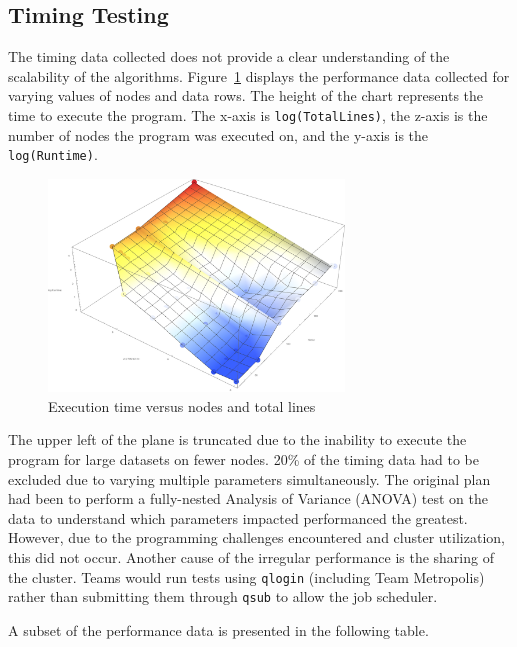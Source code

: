 

%
%

\subsection{Timing Testing}

The timing data collected does not provide a clear understanding of the scalability of the algorithms. Figure~\ref{fig:plane} displays the performance data collected for varying values of nodes and data rows. The height of the chart represents the time to execute the program. The x-axis is \texttt{log(TotalLines)}, the z-axis is the number of nodes the program was executed on, and the y-axis is the \texttt{log(Runtime)}.


\begin{figure}
\centering
\includegraphics[width=0.7\textwidth]{./images/runtimes.png}
\caption{Execution time versus nodes and total lines}
\label{fig:plane}
\end{figure}


The upper left of the plane is truncated due to the inability to execute the program for large datasets on fewer nodes. 20\% of the timing data had to be excluded due to varying multiple parameters simultaneously. The original plan had been to perform a fully-nested Analysis of Variance (ANOVA) test on the data to understand which parameters impacted performanced the greatest. However, due to the programming challenges encountered and cluster utilization, this did not occur. Another cause of the irregular performance is the sharing of the cluster. Teams would run tests using \texttt{qlogin} (including Team Metropolis) rather than submitting them through \texttt{qsub} to allow the job scheduler.

A subset of the performance data is presented in the following table.

